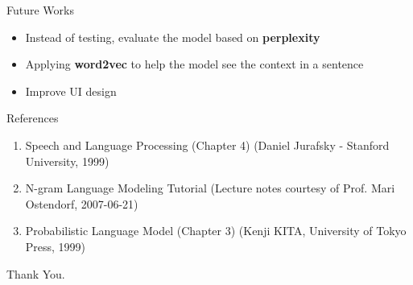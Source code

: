 \documentclass{beamer}
\begin{document}
\begin{frame}{Future Works}
    \begin{itemize}
        \item Instead of testing, evaluate the model based on \textbf{perplexity}
        \item Applying \textbf{word2vec} to help the model see the context in a sentence
        \item Improve UI design
    \end{itemize}
\end{frame}

\begin{frame}{References}
    \begin{enumerate}
        \item Speech and Language Processing (Chapter 4) (Daniel Jurafsky - Stanford University, 1999)
        \item N-gram Language Modeling Tutorial (Lecture notes courtesy of Prof. Mari Ostendorf, 2007-06-21)
        \item Probabilistic Language Model (Chapter 3) (Kenji KITA, University of Tokyo Press, 1999)
    \end{enumerate}
\end{frame}

\begin{frame}
    \centering
    \Huge Thank You.
\end{frame}

\end{document}
